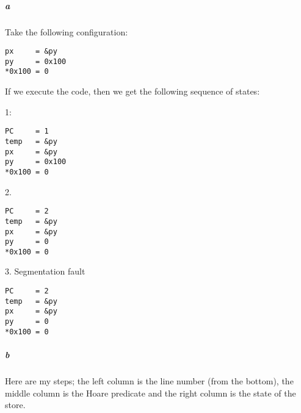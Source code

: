 \documentclass{article}
\begin{document}
\subparagraph{a}

Take the following configuration:

\begin{verbatim}
px     = &py
py     = 0x100
*0x100 = 0
\end{verbatim}

If we execute the code, then we get the following sequence of states:

1:
\begin{verbatim}
PC	   = 1
temp   = &py
px     = &py
py     = 0x100
*0x100 = 0
\end{verbatim}

2.
\begin{verbatim}
PC	   = 2
temp   = &py
px     = &py
py     = 0
*0x100 = 0
\end{verbatim}

3. Segmentation fault
\begin{verbatim}
PC	   = 2
temp   = &py
px     = &py
py     = 0
*0x100 = 0
\end{verbatim}


\subparagraph{b}

Here are my steps; the left column is the line number (from the bottom), the middle column is the Hoare predicate and the right column is the state of the store.
\end{document}
